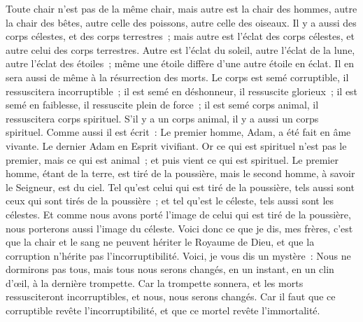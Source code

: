\begin{multicols}{2}
Toute chair n'est pas de la même chair, mais autre est la chair des hommes, autre la chair des bêtes, autre celle des poissons, autre celle des oiseaux.
Il y a aussi des corps célestes, et des corps terrestres~; mais autre est l'éclat des corps célestes, et autre celui des corps terrestres.
Autre est l'éclat du soleil, autre l'éclat de la lune, autre l'éclat des étoiles~; même une étoile diffère d'une autre étoile en éclat.
Il en sera aussi de même à la résurrection des morts. Le corps est semé corruptible, il ressuscitera incorruptible~;
il est semé en déshonneur, il ressuscite glorieux~; il est semé en faiblesse, il ressuscite plein de force~;
il est semé corps animal, il ressuscitera corps spirituel. S'il y a un corps animal, il y a aussi un corps spirituel.
Comme aussi il est écrit~: Le premier homme, Adam, a été fait en âme vivante. Le dernier Adam en Esprit vivifiant.
Or ce qui est spirituel n'est pas le premier, mais ce qui est animal~; et puis vient ce qui est spirituel.
Le premier homme, étant de la terre, est tiré de la poussière, mais le second homme, à savoir le Seigneur, est du ciel.
Tel qu'est celui qui est tiré de la poussière, tels aussi sont ceux qui sont tirés de la poussière~; et tel qu'est le céleste, tels aussi sont les célestes.
Et comme nous avons porté l'image de celui qui est tiré de la poussière, nous porterons aussi l'image du céleste.
Voici donc ce que je dis, mes frères, c'est que la chair et le sang ne peuvent hériter le Royaume de Dieu, et que la corruption n'hérite pas l'incorruptibilité.
Voici, je vous dis un mystère~: Nous ne dormirons pas tous, mais tous nous serons changés,
en un instant, en un clin d'œil, à la dernière trompette. Car la trompette sonnera, et les morts ressusciteront incorruptibles, et nous, nous serons changés.
Car il faut que ce corruptible revête l'incorruptibilité, et que ce mortel revête l'immortalité.

\end{multicols}
